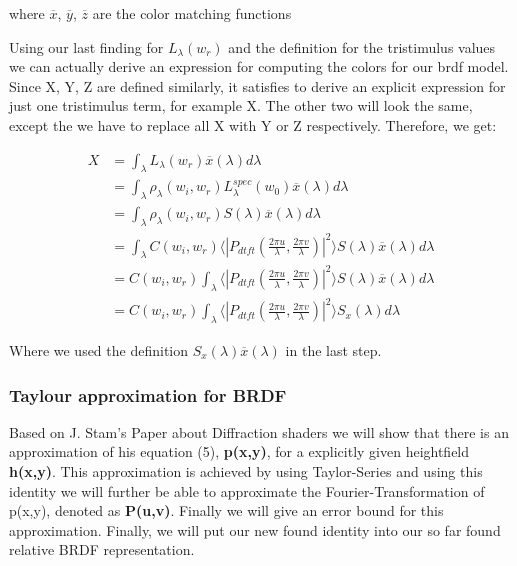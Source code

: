 where $\overline{x}$, $\overline{y}$, $\overline{z}$ are the color matching functions

Using our last finding for $L_\lambda(w_r)$ and the definition for the tristimulus values we can actually derive an expression for computing the colors for our brdf model. Since X, Y, Z are defined similarly, it satisfies to derive an explicit expression for just one tristimulus term, for example X. The other two will look the same, except the we have to replace all X with Y or Z respectively. Therefore, we get:

\begin{align*}
X 
& =\int_{\lambda}L_\lambda(w_r)\overline{x}(\lambda)d\lambda \\
& =\int_{\lambda}\rho_\lambda(w_i,w_r)L_\lambda^{spec}(w_0) \overline{x}(\lambda)d\lambda \\
& =\int_{\lambda}\rho_\lambda(w_i,w_r) S(\lambda) \overline{x}(\lambda)d\lambda \\
& =\int_{\lambda} C(w_i,w_r) \langle \left|P_{dtft}(\frac{2\pi u}{\lambda}, \frac{2\pi v}{\lambda})\right|^2\rangle S(\lambda) \overline{x}(\lambda)d\lambda \\
& = C(w_i,w_r) \int_{\lambda} \langle \left|P_{dtft}(\frac{2\pi u}{\lambda}, \frac{2\pi v}{\lambda})\right|^2\rangle S(\lambda) \overline{x}(\lambda)d\lambda \\
& = C(w_i,w_r) \int_{\lambda} \langle \left|P_{dtft}(\frac{2\pi u}{\lambda}, \frac{2\pi v}{\lambda})\right|^2\rangle S_x(\lambda)d\lambda
\end{align*}

Where we used the definition $S_x(\lambda)\overline{x}(\lambda)$ in the last step.

\subsubsection{Taylour approximation for BRDF}
Based on J. Stam's Paper about Diffraction shaders we will show that
there is an approximation of his equation (5), \textbf{p(x,y)}, for
a explicitly given heightfield \textbf{h(x,y)}. This approximation
is achieved by using Taylor-Series and using this identity we will
further be able to approximate the Fourier-Transformation of p(x,y),
denoted as \textbf{P(u,v)}. Finally we will give an error bound for
this approximation. Finally, we will put our new found identity into our so far found relative BRDF representation.

